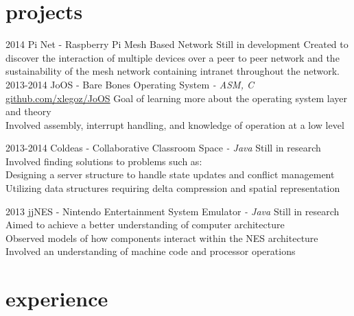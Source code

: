 \documentclass[]{friggeri-cv-short}
\begin{document}
\section{projects}

\begin{entrylist}
  \entry
  	{2014}
  	{Pi Net \textsf{- Raspberry Pi Mesh Based Network}}
  	{Still in development}
  	{Created to discover the interaction of multiple devices over a peer to peer network and the sustainability of the mesh network containing intranet throughout the network.}
  \entry
    {2013-2014}
    {JoOS \textsf{- Bare Bones Operating System \em{- ASM, C}}}
    {\href{http://github.com/xlegoz/JoOS}{github.com/xlegoz/JoOS}}
    {Goal of learning more about the operating system layer and theory \\
    Involved assembly, interrupt handling, and knowledge of operation at a low level}
    
  \entry
  	{2013-2014}
  	{Coldeas \textsf{- Collaborative Classroom Space \em{- Java}}}
  	{Still in research}
  	{Involved finding solutions to problems such as: \\
	Designing a server structure to handle state updates and conflict management \\
  	Utilizing data structures requiring delta compression and spatial representation}
 
  \entry
  	{2013}
  	{jjNES \textsf{- Nintendo Entertainment System Emulator \em{- Java}}}
  	{Still in research}
  	{Aimed to achieve a better understanding of computer architecture \\
  	Observed models of how components interact within the NES architecture \\
  	Involved an understanding of machine code and processor operations}
  	 
  
\end{entrylist}



\section{experience}
\end{document}
